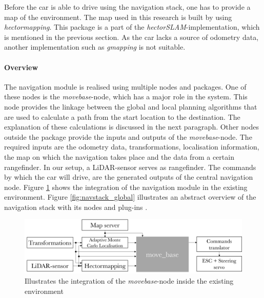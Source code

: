 \documentclass[conference,a4paper]{IEEEtran}
\begin{document}
Before the car is able to drive using the navigation stack, one has to provide a map of the environment. The map used in this research is built by using \emph{hector\textunderscore mapping}. This package is a part of the \emph{hector\textunderscore SLAM}-implementation, which is mentioned in the previous section. As the car lacks a source of odometry data, another implementation such as \emph{gmapping} is not suitable.

\paragraph{Overview}
The navigation module is realised using multiple nodes and packages. One of these nodes is the \emph{move\textunderscore base}-node, which has a major role in the system. This node provides the linkage between the global and local planning algorithms that are used to calculate a path from the start location to the destination. The explanation of these calculations is discussed in the next paragraph. Other nodes outside the package provide the inputs and outputs of the \emph{move\textunderscore base}-node. The required inputs are the odometry data, transformations, localisation information, the map on which the navigation takes place and the data from a certain rangefinder. In our setup, a LiDAR-sensor serves as rangefinder. The commands by which the car will drive, are the generated outputs of the central navigation node. Figure \ref{fig:navstack_overall} shows the integration of the navigation module in the existing environment. Figure \ref{fig:navstack_global} illustrates an abstract overview of the navigation stack with its nodes and plug-ins \cite{Marder-Eppstein2016}. 
\begin{figure}[!t]
	\includegraphics[width=\columnwidth]{navstack_overall}
	\centering
	\caption{Illustrates the integration of the \emph{move\textunderscore base}-node inside the existing environment}
	\label{fig:navstack_overall}
\end{figure}
\end{document}
